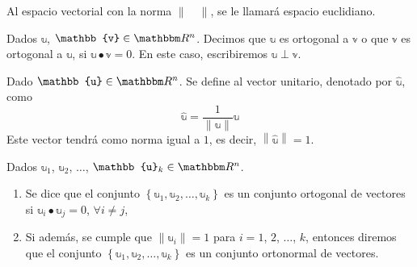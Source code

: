 \begin{definition}
    Al espacio vectorial con la norma $\| \quad \|$, se le llamará espacio euclidiano.
\end{definition}

\begin{definition}\label{def:vectoresortogonales}
    Dados $\mathbb{u}$, $\mathbb{v} \in \RR[n]$. Decimos que $\mathbb{u}$ es ortogonal a $\mathbb{v}$ o que $\mathbb{v}$ es ortogonal a $\mathbb{u}$, si $\mathbb{u} \bullet \mathbb{v} = 0$. En este caso, escribiremos $\mathbb{u} \perp \mathbb{v}$.
\end{definition}

\begin{definition}
    Dado $\mathbb{u} \in \RR[n]$. Se define al vector unitario, denotado por $\hat{\mathbb{u}}$, como
    $$\hat{\mathbb{u}} = \frac{1}{\| \mathbb{u} \|} \mathbb{u}$$
    Este vector tendrá como norma igual a $1$, es decir, $\left\| \hat{\mathbb{u}} \right\| = 1$.
\end{definition}

\begin{definition}\label{def:conjunto_ortonormal}
    Dados $\mathbb{u}_1$, $\mathbb{u}_2$, $\dots$, $\mathbb{u}_k \in \RR[n]$.
    \begin{enumerate}[label=\roman*)]
        \item Se dice que el conjunto $\left\{ \mathbb{u}_1, \mathbb{u}_2, \dots, \mathbb{u}_k \right\}$ es un conjunto ortogonal de vectores si $\mathbb{u}_i \bullet \mathbb{u}_j = 0$, $\forall i \neq j$,
        \item Si además, se cumple que $\| \mathbb{u}_i \| = 1$ para $i = 1$, $2$, $\dots$, $k$, entonces diremos que el conjunto $\left\{ \mathbb{u}_1, \mathbb{u}_2, \dots, \mathbb{u}_k \right\}$ es un conjunto ortonormal de vectores.
    \end{enumerate}
\end{definition}

